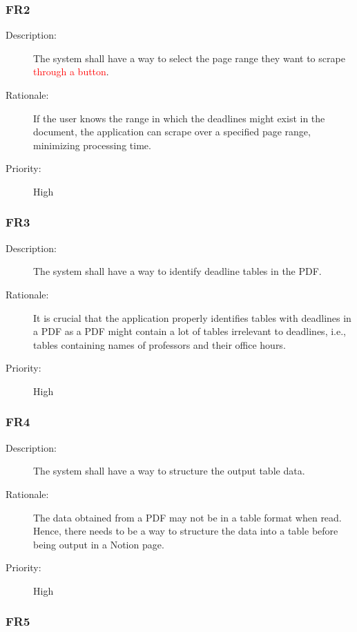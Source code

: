 \documentclass[12pt, titlepage]{article}
\begin{document}
\subsubsection{FR2}

\begin{description}
  \item[Description:] The system shall have a way to select the page range they want to scrape \textcolor{red}{through a button}. 
  \item[Rationale:] If the user knows the range in which the deadlines might exist in the document, the application can scrape over a specified page range, minimizing processing time. 
  \item[Priority:] High
\end{description}

\subsubsection{FR3}

\begin{description}
  \item[Description:] The system shall have a way to identify deadline tables in the PDF.
  \item[Rationale:] It is crucial that the application properly identifies tables with deadlines in a PDF as a PDF might contain a lot of tables irrelevant to deadlines, i.e., tables containing names of professors and their office hours. 
  \item[Priority:] High
\end{description}

\subsubsection{FR4}

\begin{description}
  \item[Description:] The system shall have a way to structure the output table data. 
  \item[Rationale:] The data obtained from a PDF may not be in a table format when read. Hence, there needs to be a way to structure the data into a table before being output in a Notion page. 
  \item[Priority:] High
\end{description}

\subsubsection{FR5}
\end{document}
